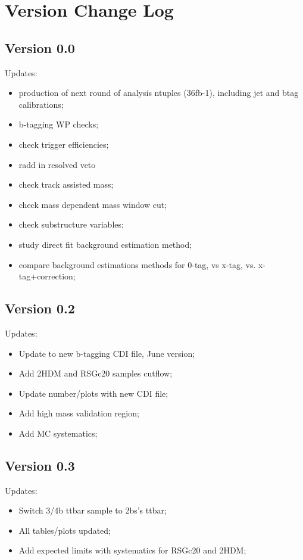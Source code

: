 \section{Version Change Log}
\subsection{Version 0.0}
Updates:
\begin{itemize}
\item production of next round of analysis ntuples (36fb-1), including jet and btag calibrations; 
\item b-tagging WP checks; 
\item check trigger efficiencies; 
\item radd in resolved veto
\item check track assisted mass;
\item check mass dependent mass window cut;
\item check substructure variables; 
\item study direct fit background estimation method; 
\item compare background estimations methods for 0-tag, vs x-tag, vs. x-tag+correction; 
\end{itemize}


\subsection{Version 0.2}
Updates:
\begin{itemize}
	\item Update to new b-tagging CDI file, June version;
	\item Add 2HDM and RSGc20 samples cutflow; 
	\item Update number/plots with new CDI file; 
	\item Add high mass validation region; 
	\item Add \ttbar MC systematics; 
\end{itemize}

\subsection{Version 0.3}
Updates:
\begin{itemize}
	\item Switch 3/4b ttbar sample to 2bs's ttbar; 
	\item All tables/plots updated; 
	\item Add expected limits with systematics for RSGc20 and 2HDM;
\end{itemize}

